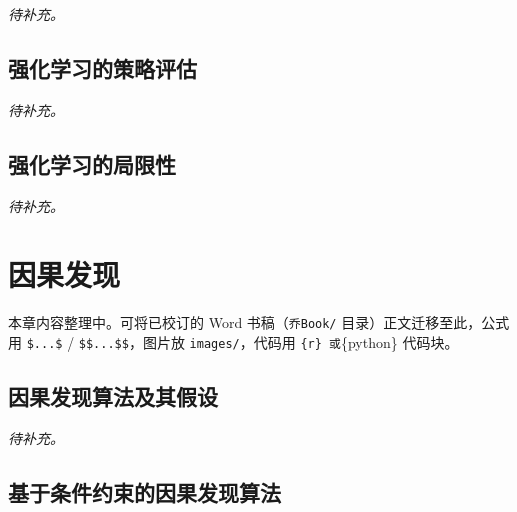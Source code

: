 \documentclass[
  chinese-hans,
  letterpaper,
  DIV=11,
  numbers=noendperiod]{scrreprt}
\begin{document}
\emph{待补充。}

\section{强化学习的策略评估}\label{ux5f3aux5316ux5b66ux4e60ux7684ux7b56ux7565ux8bc4ux4f30}

\emph{待补充。}

\section{强化学习的局限性}\label{ux5f3aux5316ux5b66ux4e60ux7684ux5c40ux9650ux6027}

\emph{待补充。}


\chapter{因果发现}\label{ux56e0ux679cux53d1ux73b0}

\begin{tcolorbox}[enhanced jigsaw, arc=.35mm, bottomrule=.15mm, bottomtitle=1mm, breakable, colback=white, colbacktitle=quarto-callout-note-color!10!white, colframe=quarto-callout-note-color-frame, coltitle=black, left=2mm, leftrule=.75mm, opacityback=0, opacitybacktitle=0.6, rightrule=.15mm, title=\textcolor{quarto-callout-note-color}{\faInfo}\hspace{0.5em}{编写说明}, titlerule=0mm, toprule=.15mm, toptitle=1mm]

本章内容整理中。可将已校订的 Word 书稿（\texttt{乔Book/}
目录）正文迁移至此，公式用 \texttt{\$...\$} /
\texttt{\$\$...\$\$}，图片放 \texttt{images/}，代码用
\texttt{\{r\}\ 或}\{python\} 代码块。

\end{tcolorbox}

\section{因果发现算法及其假设}\label{ux56e0ux679cux53d1ux73b0ux7b97ux6cd5ux53caux5176ux5047ux8bbe}

\emph{待补充。}

\section{基于条件约束的因果发现算法}\label{ux57faux4e8eux6761ux4ef6ux7ea6ux675fux7684ux56e0ux679cux53d1ux73b0ux7b97ux6cd5}
\end{document}
